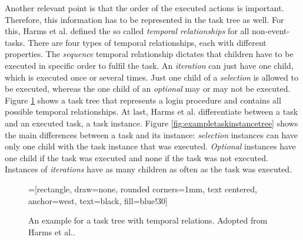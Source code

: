 Another relevant point is that the order of the executed actions is important.
Therefore, this information has to be represented in the task tree as well.
For this, Harms et al. defined the so called \textit{temporal relationships} for all non-event-tasks.
There are four types of temporal relationships, each with different properties.
The \textit{sequence} temporal relationship dictates that children have to be executed in specific order to fulfil the task.
An \textit{iteration} can just have one child, which is executed once or several times.
Just one child of a \textit{selection} is allowed to be executed, whereas the one child of an \textit{optional} may or may not be executed.
Figure \ref{fig:exampletasktree} shows a task tree that represents a login procedure and contains all possible temporal relationships.
At last, Harms et al. differentiate between a task and an executed task, a task instance.
Figure \ref{fig:exampletaskinstancetree} shows the main differences between a task and its instance: \textit{selection} instances can have only one child with the task instance that was executed. \textit{Optional} instances have one child if the task was executed and none if the task was not executed. Instances of \textit{iterations} have as many children as often as the task was executed.
\begin{figure}[h]
		=[rectangle, draw=none, rounded corners=1mm,
		        text centered, anchor=west, text=black, fill=blue!30]

		\caption{An example for a task tree with temporal relations. Adopted from Harms et al.\cite{harms2013}.}
		\label{fig:exampletasktree}
	\end{figure}
